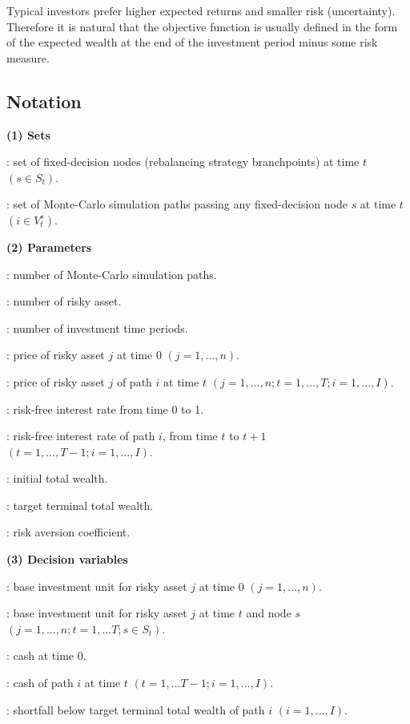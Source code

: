 \documentclass[11t]{article}
\begin{document}
Typical investors prefer higher expected returns and smaller risk (uncertainty). Therefore it is natural that the objective function is usually defined in the form of the expected wealth at the end of the investment period minus some risk measure.

\subsection{Notation}
{\bf (1) Sets}
\begin{description}
\setlength{\leftskip}{0.3in}
  \item[$S_t$] : set of fixed-decision nodes (rebalancing strategy branchpoints) at time $t$ $(s \in S_t)$.
  \item[$V_t^s$] : set of Monte-Carlo simulation paths passing any fixed-decision node $s$ at time $t$ $(i \in V_t^s)$. 
\end{description}
{\bf (2) Parameters}
\begin{description}
\setlength{\leftskip}{0.3in}
  \item[$I$] : number of Monte-Carlo simulation paths.
  \item[$n$] : number of risky asset.
  \item[$T$] : number of investment time periods.
  \item[$\rho_{j0}$] : price of risky asset $j$ at time 0 $(j=1,...,n)$.
  \item[$\rho_{jt}^{(i)}$] : price of risky asset $j$ of path $i$ at time $t$ $(j=1,...,n; t=1,...,T; i=1,...,I)$.
  \item[$r_0$] : risk-free interest rate from time 0 to 1.
  \item[$r_{t}^{(i)}$] : risk-free interest rate of path $i$, from time $t$ to $t+1$ $(t=1,...,T-1; i=1,...,I)$.
  \item[$W_0$] : initial total wealth.
  \item[$W_G$] : target terminal total wealth.
  \item[$\gamma$] : risk aversion coefficient.
\end{description}
{\bf (3) Decision variables}
\begin{description}
\setlength{\leftskip}{0.3in}
  \item[$z_{j0}$] : base investment unit for risky asset $j$ at time $0$ $(j = 1,...,n)$.
  \item[$z_{jt}^{s}$] : base investment unit for risky asset $j$ at time $t$ and node $s$ $(j = 1,...,n; t=1,...T; s \in S_t)$.
  \item[$v_{0}$] : cash at time 0.
  \item[$v_{t}^{(i)}$] : cash of path $i$ at time $t$ $(t=1,...T-1; i=1,...,I)$.
  \item[$q^{(i)}$] : shortfall below target terminal total wealth of path $i$ $(i=1,...,I)$.
\end{description}
\end{document}
